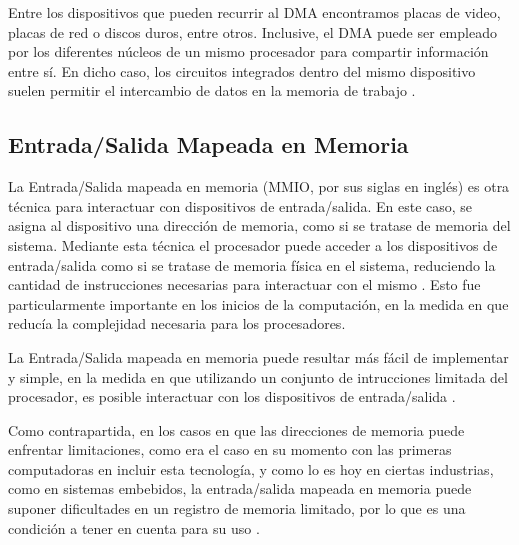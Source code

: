 \documentclass[12pt]{article}
\begin{document}
Entre los dispositivos que pueden recurrir al DMA encontramos placas de video,
placas de red o discos duros, entre otros. Inclusive, el DMA puede ser empleado
por los diferentes núcleos de un mismo procesador para compartir información
entre sí. En dicho caso, los circuitos integrados dentro del mismo dispositivo
suelen permitir el intercambio de datos en la memoria de trabajo \parencite{directmemoryaccess}.

\subsection{Entrada/Salida Mapeada en Memoria}

La Entrada/Salida mapeada en memoria (MMIO, por sus siglas en inglés)
es otra técnica para interactuar con dispositivos de entrada/salida. 
En este caso, se asigna al dispositivo una
dirección de memoria, como si se tratase de memoria del sistema. Mediante esta
técnica el procesador puede acceder a los dispositivos de entrada/salida como si
se tratase de memoria física en el sistema, reduciendo la cantidad de instrucciones
necesarias para interactuar con el mismo \parencite{wikientradasalidamapeada}.
Esto fue particularmente importante en los inicios de la computación, en la
medida en que reducía la complejidad necesaria para los procesadores.

La Entrada/Salida mapeada en memoria puede resultar más fácil de implementar y
simple, en la medida en que utilizando un conjunto de intrucciones limitada 
del procesador, es posible interactuar con los dispositivos de entrada/salida \parencite{stallings2016computer}.

Como contrapartida,
en los casos en que las direcciones de memoria puede enfrentar limitaciones,
como era el caso en su momento con las primeras computadoras en incluir esta tecnología,
y como lo es hoy en ciertas industrias,
como en sistemas embebidos,
la entrada/salida mapeada en memoria puede suponer dificultades en un registro de memoria limitado,
por lo que es una condición a tener en cuenta para su uso \parencite{wikimemorymappedio}.

\printbibliography[heading=bibnumbered]
\end{document}
